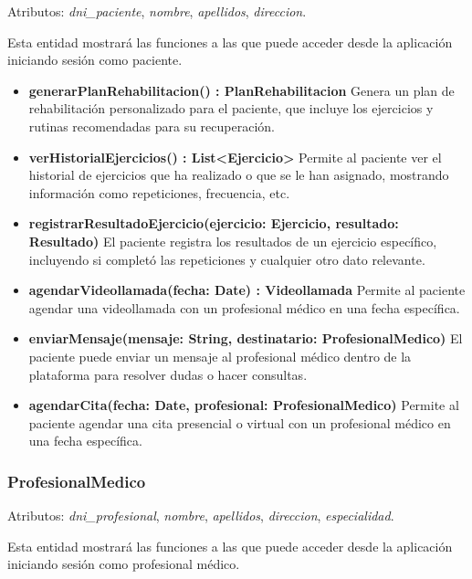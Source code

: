 \documentclass{article}
\begin{document}
Atributos: \textit{dni\_paciente}, \textit{nombre}, \textit{apellidos}, \textit{direccion}.

Esta entidad mostrará las funciones a las que puede acceder desde la aplicación iniciando sesión como paciente.

\begin{itemize}
	\item \textbf{generarPlanRehabilitacion() : PlanRehabilitacion}  
	Genera un plan de rehabilitación personalizado para el paciente, que incluye los ejercicios y rutinas recomendadas para su recuperación.
	
	\item \textbf{verHistorialEjercicios() : List<Ejercicio>}  
	Permite al paciente ver el historial de ejercicios que ha realizado o que se le han asignado, mostrando información como repeticiones, frecuencia, etc.
	
	\item \textbf{registrarResultadoEjercicio(ejercicio: Ejercicio, resultado: Resultado)}  
	El paciente registra los resultados de un ejercicio específico, incluyendo si completó las repeticiones y cualquier otro dato relevante.
	
	\item \textbf{agendarVideollamada(fecha: Date) : Videollamada}  
	Permite al paciente agendar una videollamada con un profesional médico en una fecha específica.
	
	\item \textbf{enviarMensaje(mensaje: String, destinatario: ProfesionalMedico)}  
	El paciente puede enviar un mensaje al profesional médico dentro de la plataforma para resolver dudas o hacer consultas.
	
	\item \textbf{agendarCita(fecha: Date, profesional: ProfesionalMedico)}  
	Permite al paciente agendar una cita presencial o virtual con un profesional médico en una fecha específica.
\end{itemize}

\subsubsection*{ProfesionalMedico}
Atributos: \textit{dni\_profesional}, \textit{nombre}, \textit{apellidos}, \textit{direccion}, \textit{especialidad}.

Esta entidad mostrará las funciones a las que puede acceder desde la aplicación iniciando sesión como profesional médico.
\end{document}
